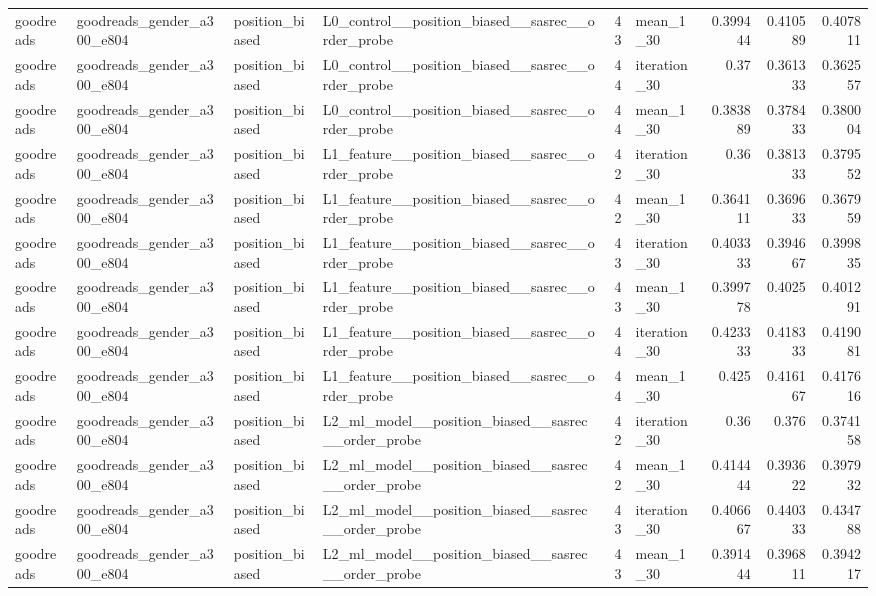 \begin{table}[htbp!]
\begin{tabular}{llllrlrrr}
goodreads & goodreads\_gender\_a300\_e804 & position\_biased & L0\_control\_\_position\_biased\_\_sasrec\_\_order\_probe & 43 & mean\_1\_30 & 0.399444 & 0.410589 & 0.407811 \\
goodreads & goodreads\_gender\_a300\_e804 & position\_biased & L0\_control\_\_position\_biased\_\_sasrec\_\_order\_probe & 44 & iteration\_30 & 0.37 & 0.361333 & 0.362557 \\
goodreads & goodreads\_gender\_a300\_e804 & position\_biased & L0\_control\_\_position\_biased\_\_sasrec\_\_order\_probe & 44 & mean\_1\_30 & 0.383889 & 0.378433 & 0.380004 \\
goodreads & goodreads\_gender\_a300\_e804 & position\_biased & L1\_feature\_\_position\_biased\_\_sasrec\_\_order\_probe & 42 & iteration\_30 & 0.36 & 0.381333 & 0.379552 \\
goodreads & goodreads\_gender\_a300\_e804 & position\_biased & L1\_feature\_\_position\_biased\_\_sasrec\_\_order\_probe & 42 & mean\_1\_30 & 0.364111 & 0.369633 & 0.367959 \\
goodreads & goodreads\_gender\_a300\_e804 & position\_biased & L1\_feature\_\_position\_biased\_\_sasrec\_\_order\_probe & 43 & iteration\_30 & 0.403333 & 0.394667 & 0.399835 \\
goodreads & goodreads\_gender\_a300\_e804 & position\_biased & L1\_feature\_\_position\_biased\_\_sasrec\_\_order\_probe & 43 & mean\_1\_30 & 0.399778 & 0.4025 & 0.401291 \\
goodreads & goodreads\_gender\_a300\_e804 & position\_biased & L1\_feature\_\_position\_biased\_\_sasrec\_\_order\_probe & 44 & iteration\_30 & 0.423333 & 0.418333 & 0.419081 \\
goodreads & goodreads\_gender\_a300\_e804 & position\_biased & L1\_feature\_\_position\_biased\_\_sasrec\_\_order\_probe & 44 & mean\_1\_30 & 0.425 & 0.416167 & 0.417616 \\
goodreads & goodreads\_gender\_a300\_e804 & position\_biased & L2\_ml\_model\_\_position\_biased\_\_sasrec\_\_order\_probe & 42 & iteration\_30 & 0.36 & 0.376 & 0.374158 \\
goodreads & goodreads\_gender\_a300\_e804 & position\_biased & L2\_ml\_model\_\_position\_biased\_\_sasrec\_\_order\_probe & 42 & mean\_1\_30 & 0.414444 & 0.393622 & 0.397932 \\
goodreads & goodreads\_gender\_a300\_e804 & position\_biased & L2\_ml\_model\_\_position\_biased\_\_sasrec\_\_order\_probe & 43 & iteration\_30 & 0.406667 & 0.440333 & 0.434788 \\
goodreads & goodreads\_gender\_a300\_e804 & position\_biased & L2\_ml\_model\_\_position\_biased\_\_sasrec\_\_order\_probe & 43 & mean\_1\_30 & 0.391444 & 0.396811 & 0.394217 \\

\end{tabular}
\end{table}
